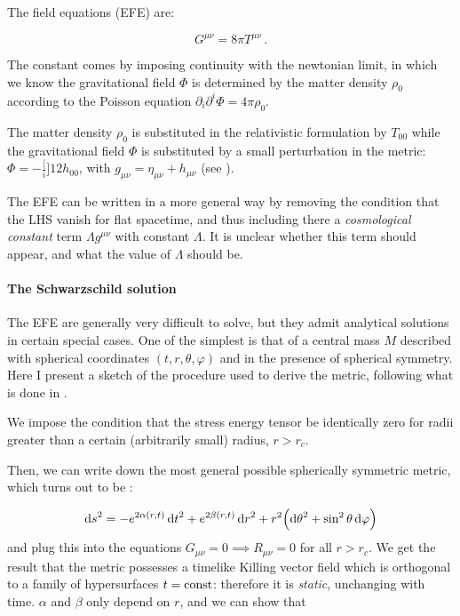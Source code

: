 \documentclass[main.tex]{subfiles}
\begin{document}
The field equations (EFE) are:

\begin{equation} \label{eq:EFE}
  G^{\mu\nu} = 8 \pi T^{\mu\nu} \,.
\end{equation}

The constant comes by imposing continuity with the newtonian limit, in which we know the gravitational field \(\Phi\) is determined by the matter density \(\rho_0\) according to the Poisson equation \(\partial_i \partial^i \Phi = 4 \pi \rho_0\).

The matter density \(\rho_0\) is substituted in the relativistic formulation by \(T_{00}\) while the gravitational field \(\Phi\) is substituted by a small perturbation in the metric: \(\Phi = -\frac[i]{1}{2}  h_{00}\), with \(g_{\mu \nu} = \eta_{\mu\nu} + h_{\mu\nu}\) (see \cite[eq. 4.46]{Carroll:1997ar}).

The EFE can be written in a more general way by removing the condition that the LHS vanish for flat spacetime, and thus including there a \emph{cosmological constant}  term \(\Lambda g^{\mu\nu}\) with constant \(\Lambda\).
It is unclear whether this term should appear, and what the value of \(\Lambda\) should be.

\paragraph{The Schwarzschild solution}


The EFE are generally very difficult to solve, but they admit analytical solutions in certain special cases.
One of the simplest is that of a central mass \(M\) described with spherical coordinates \((t, r, \theta, \varphi)\) and in the presence of spherical symmetry. Here I present a sketch of the procedure used to derive the metric, following what is done in \textcite[section 7]{Carroll:1997ar}.

We impose the condition that the stress energy tensor be identically zero for radii greater than a certain (arbitrarily small) radius, \(r > r_c\).

Then, we can write down the most general possible spherically symmetric metric, which turns out to be \cite[eq. 7.13]{Carroll:1997ar}:

\begin{equation}
  \dd{s} ^2 = -e^{2 \alpha(r, t)} \dd{t}^2 + e^{2 \beta(r, t)} \dd{r}^2
  + r^2 \qty(\dd{\theta}^2 + \sin^2\theta \dd{\varphi})
\end{equation}
and plug this into the equations \(G_{\mu\nu} = 0 \implies R_{\mu\nu} = 0 \) for all \(r>r_c\).
We get the result that the metric possesses a timelike Killing vector field which is orthogonal to a family of hypersurfaces \(t = \operatorname{const}\): therefore it is \emph{static}, unchanging with time.
\(\alpha\) and \(\beta\) only depend on \(r\), and we can show that
\end{document}
